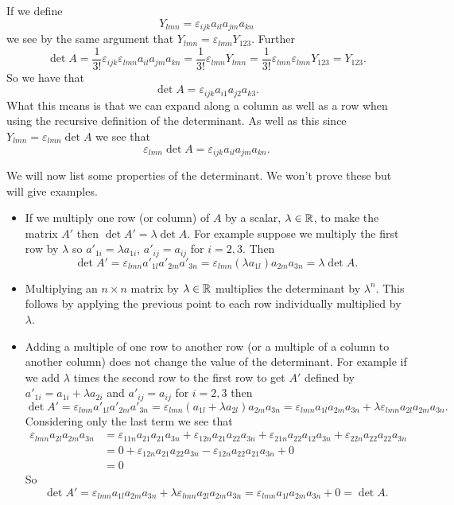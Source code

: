 If we define
\[Y_{lmn} = \varepsilon_{ijk}a_{il}a_{jm}a_{kn}\]
we see by the same argument that \(Y_{lmn} = \varepsilon_{lmn}Y_{123}\).
Further
\[\det A = \frac{1}{3!}\varepsilon_{ijk}\varepsilon_{lmn}a_{il}a_{jm}a_{kn} = \frac{1}{3!}\varepsilon_{lmn}Y_{lmn} = \frac{1}{3!}\varepsilon_{lmn}\varepsilon_{lmn}Y_{123} = Y_{123}.\]
So we have that
\[\det A = \varepsilon_{ijk}a_{i1}a_{j2}a_{k3}.\]
What this means is that we can expand along a column as well as a row when using the recursive definition of the determinant.
As well as this since \(Y_{lmn} = \varepsilon_{lmn}\det A\) we see that
\[\varepsilon_{lmn}\det A = \varepsilon_{ijk}a_{il}a_{jm}a_{kn}.\]

We will now list some properties of the determinant.
We won't prove these but will give examples.
\begin{itemize}
    \item If we multiply one row (or column) of \(A\) by a scalar, \(\lambda\in\mathbb{R}\), to make the matrix \(A'\)  then \(\det A' = \lambda\det A\).
    For example suppose we multiply the first row by \(\lambda\) so \(a'_{1i} = \lambda a_{1i}\), \(a'_{ij} = a_{ij}\) for \(i = 2, 3\).
    Then
    \[\det A' = \varepsilon_{lmn}a'_{1l}a'_{2m}a'_{3n} = \varepsilon_{lmn}(\lambda a_{1l})a_{2m}a_{3n} = \lambda \det A.\]
    
    \item Multiplying an \(n\times n\) matrix by \(\lambda\in\mathbb{R}\) multiplies the determinant by \(\lambda^n\).
    This follows by applying the previous point to each row individually multiplied by \(\lambda\).
    
    \item Adding a multiple of one row to another row (or a multiple of a column to another column) does not change the value of the determinant.
    For example if we add \(\lambda\) times the second row to the first row to get \(A'\) defined by \(a'_{1i} = a_{1i} + \lambda a_{2i}\) and \(a'_{ij} = a_{ij}\) for \(i = 2, 3\) then
    \[\det A' = \varepsilon_{lmn}a'_{1l}a'_{2m}a'_{3n} = \varepsilon_{lmn}(a_{1l} + \lambda a_{2l})a_{2m}a_{3n} = \varepsilon_{lmn}a_{1l}a_{2m}a_{3n} + \lambda\varepsilon_{lmn}a_{2l}a_{2m}a_{3n}.\]
    Considering only the last term we see that
    \begin{align*}
        \varepsilon_{lmn}a_{2l}a_{2m}a_{3n} &= \varepsilon_{11n}a_{21}a_{21}a_{3n} + \varepsilon_{12n}a_{21}a_{22}a_{3n} + \varepsilon_{21n}a_{22}a_{12}a_{3n} + \varepsilon_{22n}a_{22}a_{22}a_{3n}\\
        &= 0 + \varepsilon_{12n}a_{21}a_{22}a_{3n} - \varepsilon_{12n}a_{22}a_{21}a_{3n} + 0\\
        &= 0
    \end{align*}
    So
    \[\det A' = \varepsilon_{lmn}a_{1l}a_{2m}a_{3n} + \lambda\varepsilon_{lmn}a_{2l}a_{2m}a_{3n} = \varepsilon_{lmn}a_{1l}a_{2m}a_{3n} + 0 = \det A.\]
    

\end{itemize}
